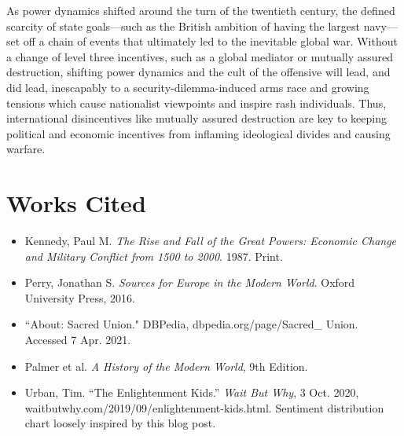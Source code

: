 \documentclass[letterpaper]{article}
\begin{document}
As power dynamics shifted around the turn of the twentieth century, the defined scarcity of state goals---such as the British ambition of having the largest navy---set off a chain of events that ultimately led to the inevitable global war. Without a change of level three incentives, such as a global mediator or mutually assured destruction, shifting power dynamics and the cult of the offensive will lead, and did lead, inescapably to a security-dilemma-induced arms race and growing tensions which cause nationalist viewpoints and inspire rash individuals. Thus, international disincentives like mutually assured destruction are key to keeping political and economic incentives from inflaming ideological divides and causing warfare.

\section{Works Cited}
\label{sec:org351b7ce}

\begin{itemize}
\item Kennedy, Paul M. \emph{The Rise and Fall of the Great Powers: Economic Change and Military Conflict from 1500 to 2000}. 1987. Print.
\item Perry, Jonathan S. \emph{Sources for Europe in the Modern World}. Oxford University Press, 2016.
\item ``About: Sacred Union." DBPedia, dbpedia.org/page/Sacred\_ Union. Accessed 7 Apr. 2021.
\item Palmer et al. \emph{A History of the Modern World}, 9th Edition.
\item Urban, Tim. “The Enlightenment Kids.” \emph{Wait But Why}, 3 Oct. 2020, waitbutwhy.com/2019/09/enlightenment-kids.html. Sentiment distribution chart loosely inspired by this blog post.
\end{itemize}
\end{document}
